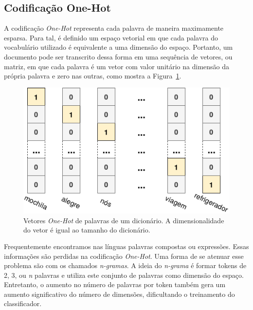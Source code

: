 \subsection{Codificação One-Hot}

A codificação \textit{One-Hot} representa cada palavra de maneira maximamente
esparsa.
Para tal, é definido um espaço vetorial em que cada palavra do vocabulário
utilizado é equivalente a uma dimensão do espaço.
Portanto, um documento pode ser transcrito dessa forma em uma sequência de
vetores, ou matriz, em que cada palavra é um vetor com valor unitário na
dimensão da própria palavra e zero nas outras, como mostra a
Figura~\ref{fig:onehot}.

\begin{figure}[h]
\begin{center} {
    \begin{center}
    \includegraphics[scale=0.30]{images/onehot.png}
    \caption{Vetores \textit{One-Hot} de palavras de um dicionário.
             A dimensionalidade do vetor é igual ao tamanho do dicionário.}
    \label{fig:onehot}
    \end{center}
}
\end{center}
\end{figure}

Frequentemente encontramos nas línguas palavras compostas ou expressões.
Essas informações são perdidas na codificação \textit{One-Hot}.
Uma forma de se atenuar esse problema são com os chamados \textit{n-gramas}.
A ideia do \textit{n-grama} é formar tokens de 2, 3, ou \textit{n} palavras e
utiliza este conjunto de palavras como dimensão do espaço.
Entretanto, o aumento no número de palavras por token também gera um aumento
significativo do número de dimensões, dificultando o treinamento do
classificador.

